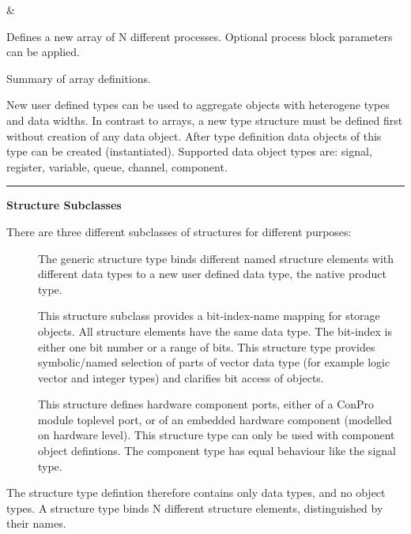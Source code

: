 \documentclass[a4paper,12pt,twoside,english]{article}
\begin{document}
\begin{table}
\begin{center}
{{{{\content

\vskip3pt}
}&
\parbox[t]{150 pt}{
\vskip3pt\hskip5pt\parbox[t]{140pt}{\raggedright Defines a new array of N different processes. Optional process block parameters can be applied.


\vskip3pt}
}\cr
}
}
\end{center}

\caption{Summary of array definitions.
}
\label{table:17}
\end{table}



\def\thesubsubsection{\tocXXV}
\secIII{\label{toclabelXXV}\thesubsubsection}
New user defined types can be used to aggregate objects with heterogene types and data widths. In
contrast to arrays, a new type structure must be defined first without creation of any data object. After type definition data objects of this type can be
created (instantiated). Supported data object types are: signal, register, variable, queue, channel, component.


\vskip5pt
\vskip5pt\color{highlight-color}
{\rule[-1pt]{2em}{1em}\hskip15pt\bf Structure Subclasses

}
\color{black}
There are three different subclasses of structures for different purposes:


\begin{description}
\item[] $ $\\
The generic structure type binds different named structure elements with different data types to a new user defined data type, the native product type. 

\item[] $ $\\
This structure subclass provides a bit-index-name mapping for storage objects. All structure elements have the same data type. The bit-index is either one bit
number or a range of bits. This structure type provides symbolic/named selection of parts of vector data type (for example logic vector and integer types) and
clarifies bit access of objects.  

\item[] $ $\\
This structure defines hardware component ports, either of a ConPro module toplevel port, or of an embedded hardware component (modelled on hardware level).
This structure type can only be used with component object defintions. The component type has equal behaviour like the signal type.


\end{description}
The structure type defintion therefore contains only data types, and no object types. A structure type binds N different structure elements, distinguished by
their names.
\end{document}
